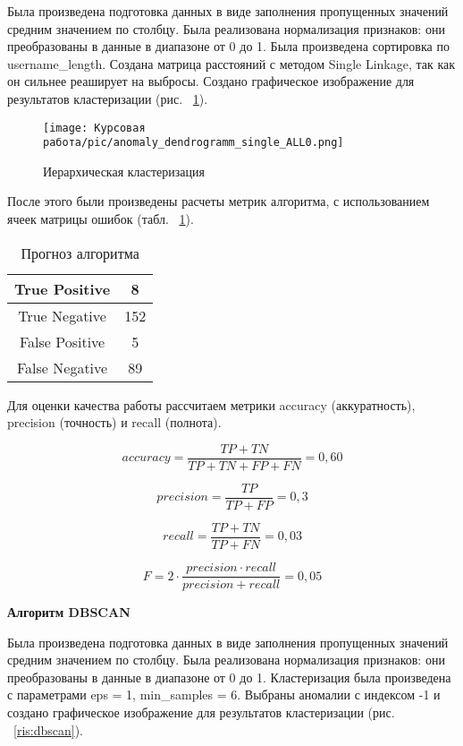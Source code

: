 Была произведена подготовка данных в виде заполнения пропущенных значений средним значением по столбцу. Была реализована нормализация признаков: они преобразованы в данные в диапазоне от 0 до 1. Была произведена сортировка по username\_length. Создана матрица расстояний с методом Single Linkage, так как он сильнее реаширует на выбросы. Создано графическое изображение для результатов кластеризации (рис. ~\ref{ris:anomaly-dendrogramm}).

\begin{figure}[H]
    \texttt{[image: Курсовая работа/pic/anomaly\_dendrogramm\_single\_ALL0.png]}
    \caption{Иерархическая кластеризация}
    \label{ris:anomaly-dendrogramm}
\end{figure}

После этого были произведены расчеты метрик алгоритма, с использованием ячеек матрицы ошибок (табл. ~\ref{tabular:tableHierarchyClust}). 

\begin{table}[!ht]
    \onehalfspacing \caption{Прогноз алгоритма}
    \medskip
        \begin{tabular}{|c|c|}
        \hline
            True Positive & 8\\  \hline 
            True Negative & 152\\  \hline 
            False Positive & 5\\  \hline 
            False Negative & 89\\  \hline 
        \end{tabular}
    \label{tabular:tableHierarchyClust}
\end{table}

Для оценки качества работы рассчитаем метрики accuracy (аккуратность), precision (точность) и recall (полнота).

$$
accuracy = \frac{TP+TN}{TP+TN+FP+FN} = 0,60
$$

$$
precision = \frac{TP}{TP+FP} =  0,3
$$

$$
recall = \frac{TP+TN}{TP+FN} = 0,03
$$

$$
F = 2\cdot \frac{precision \cdot recall}{precision+recall} = 0,05
$$


\vspace{1.5em}
\textbf{Алгоритм DBSCAN}

Была произведена подготовка данных в виде заполнения пропущенных значений средним значением по столбцу. Была реализована нормализация признаков: они преобразованы в данные в диапазоне от 0 до 1. Кластеризация была произведена с параметрами eps = 1, min\_samples = 6. Выбраны аномалии с индексом -1 и создано графическое изображение для результатов кластеризации (рис. ~\ref{ris:dbscan}).

